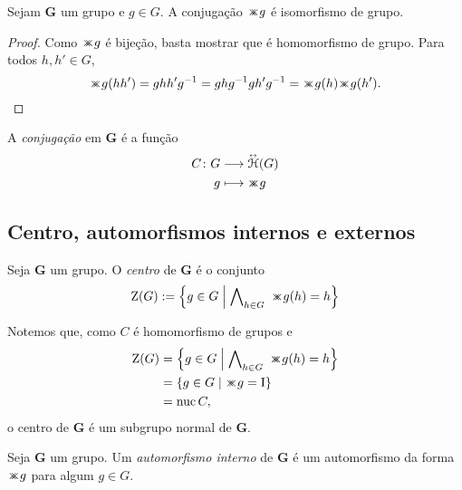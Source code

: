 \begin{proposition}
Sejam $\bm G$ um grupo e $g \in G$. A conjugação $\con{g}$ é isomorfismo de grupo.
\end{proposition}
\begin{proof}
Como $\con{g}$ é bijeção, basta mostrar que é homomorfismo de grupo. Para todos $h,h' \in G$,
	\begin{equation*}
		\con{g}(hh') = ghh'g\inv = ghg\inv gh'g\inv = \con{g}(h)\con{g}(h').
	\end{equation*}
\end{proof}

A \emph{conjugação} em $\bm G$ é a função
	\begin{align*}
		\func{C}{G}{\Iso{\Homo}(G)}{g}{\con{g}}
	\end{align*}

%

\subsection{Centro, automorfismos internos e externos}

\begin{definition}
Seja $\bm G$ um grupo. O \emph{centro} de $\bm G$ é o conjunto
	\begin{equation*}
		\Zen(G) := \set{g \in G}{\forall_{h \in G}\ \con{g}(h)=h}
	\end{equation*}
\end{definition}


Notemos que, como $C$ é homomorfismo de grupos e 
	\begin{align*}
		\Zen(G) &= \set{g \in G}{\forall_{h \in G}\ \con{g}(h) = h} \\
				&= \set{g \in G}{\con{g} = \Id} \\
				&= \nuc{C},
	\end{align*}
o centro de $\bm G$ é um subgrupo normal de $\bm G$.

\begin{definition}
Seja $\bm G$ um grupo. Um \emph{automorfismo interno} de $\bm G$ é um automorfismo da forma $\con{g}$ para algum $g \in G$.
\end{definition}


